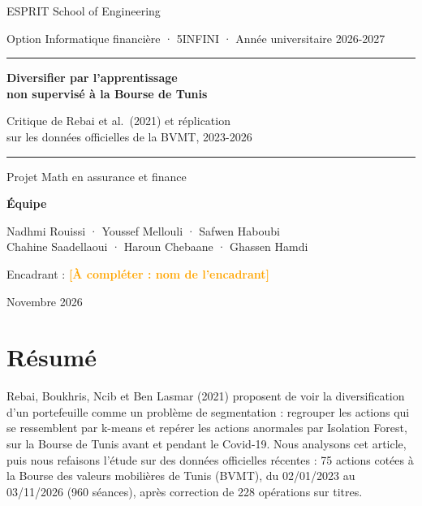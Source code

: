 \documentclass[11pt,a4paper]{article}
\newcommand{\afaire}[1]{\textcolor{orange}{\textbf{[À compléter : #1]}}}
\begin{document}
\begin{titlepage}
\centering
{\large ESPRIT School of Engineering\par}
{\normalsize Option Informatique financière · 5INFINI · Année universitaire 2026-2027\par}
\vspace{2.2cm}
{\color{navy}\rule{\linewidth}{1pt}\par\vspace{0.4cm}}
{\Huge\bfseries\color{navy} Diversifier par l'apprentissage\\[4pt] non supervisé à la Bourse de Tunis\par}
\vspace{0.4cm}
{\Large Critique de Rebai et al.\ (2021) et réplication\\ sur les données officielles de la BVMT, 2023-2026\par}
{\color{navy}\rule{\linewidth}{1pt}\par}
\vspace{1.2cm}
{\large Projet Math en assurance et finance\par}
\vspace{1.5cm}
{\large\bfseries Équipe\par}
\vspace{0.2cm}
{\large Nadhmi Rouissi · Youssef Mellouli · Safwen Haboubi\\ Chahine Saadellaoui · Haroun Chebaane · Ghassen Hamdi\par}
\vspace{1.2cm}
{\large Encadrant : \afaire{nom de l'encadrant}\par}
\vfill
{\large Novembre 2026\par}
\end{titlepage}

\section*{Résumé}
Rebai, Boukhris, Ncib et Ben Lasmar (2021) proposent de voir la diversification d'un portefeuille comme un problème de segmentation : regrouper les actions qui se ressemblent par k-means et repérer les actions anormales par Isolation Forest, sur la Bourse de Tunis avant et pendant le Covid-19. Nous analysons cet article, puis nous refaisons l'étude sur des données officielles récentes : 75 actions cotées à la Bourse des valeurs mobilières de Tunis (BVMT), du 02/01/2023 au 03/11/2026 (960 séances), après correction de 228 opérations sur titres.
\end{document}
